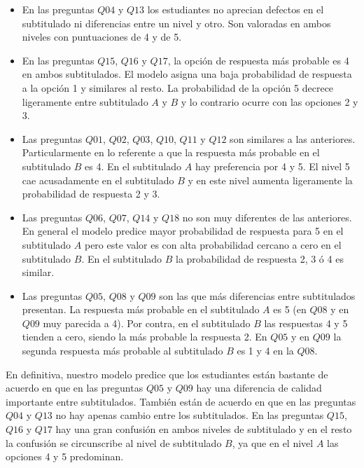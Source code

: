 \documentclass[
  12pt,
  a4paper,
  extrafontsizes,
  onecolumn,
  openright]{memoir}
\begin{document}
\begin{itemize}
\item
  En las preguntas \(Q04\) y \(Q13\) los estudiantes no aprecian
  defectos en el subtitulado ni diferencias entre un nivel y otro. Son
  valoradas en ambos niveles con puntuaciones de 4 y de 5.
\item
  En las preguntas \(Q15\), \(Q16\) y \(Q17\), la opción de respuesta
  más probable es 4 en ambos subtitulados. El modelo asigna una baja
  probabilidad de respuesta a la opción 1 y similares al resto. La
  probabilidad de la opción 5 decrece ligeramente entre subtitulado
  \(A\) y \(B\) y lo contrario ocurre con las opciones 2 y 3.
\item
  Las preguntas \(Q01\), \(Q02\), \(Q03\), \(Q10\), \(Q11\) y \(Q12\)
  son similares a las anteriores. Particularmente en lo referente a que
  la respuesta más probable en el subtitulado \(B\) es 4. En el
  subtitulado \(A\) hay preferencia por 4 y 5. El nivel 5 cae
  acusadamente en el subtitulado \(B\) y en este nivel aumenta
  ligeramente la probabilidad de respuesta 2 y 3.
\item
  Las preguntas \(Q06\), \(Q07\), \(Q14\) y \(Q18\) no son muy
  diferentes de las anteriores. En general el modelo predice mayor
  probabilidad de respuesta para 5 en el subtitulado \(A\) pero este
  valor es con alta probabilidad cercano a cero en el subtitulado \(B\).
  En el subtitulado \(B\) la probabilidad de respuesta 2, 3 ó 4 es
  similar.
\item
  Las preguntas \(Q05\), \(Q08\) y \(Q09\) son las que más diferencias
  entre subtitulados presentan. La respuesta más probable en el
  subtitulado \(A\) es 5 (en \(Q08\) y en \(Q09\) muy parecida a 4). Por
  contra, en el subtitulado \(B\) las respuestas 4 y 5 tienden a cero,
  siendo la más probable la respuesta 2. En \(Q05\) y en \(Q09\) la
  segunda respuesta más probable al subtitulado \(B\) es 1 y 4 en la
  \(Q08\).
\end{itemize}

En definitiva, nuestro modelo predice que los estudiantes están bastante
de acuerdo en que en las preguntas \(Q05\) y \(Q09\) hay una diferencia
de calidad importante entre subtitulados. También están de acuerdo en
que en las preguntas \(Q04\) y \(Q13\) no hay apenas cambio entre los
subtitulados. En las preguntas \(Q15\), \(Q16\) y \(Q17\) hay una gran
confusión en ambos niveles de subtitulado y en el resto la confusión se
circunscribe al nivel de subtitulado \(B\), ya que en el nivel \(A\) las
opciones 4 y 5 predominan.
\end{document}
